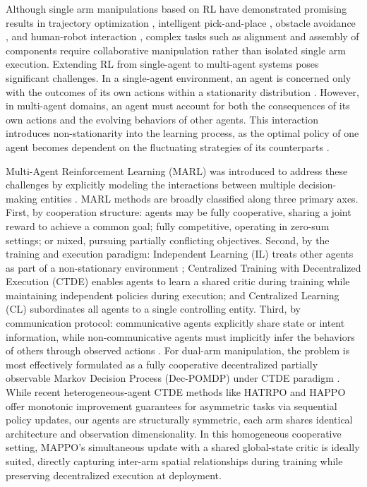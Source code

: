 \documentclass[lettersize,journal]{IEEEtran}
\begin{document}
Although single arm manipulations based on RL have demonstrated promising results in trajectory optimization \cite{intro-11, intro-12, intro-13}, intelligent pick-and-place \cite{intro-14, intro-15}, obstacle avoidance \cite{intro-16, intro-17}, and human-robot interaction \cite{intro-18, intro-19}, complex tasks such as alignment and assembly of components require collaborative manipulation rather than isolated single arm execution. Extending RL from single-agent to multi-agent systems poses significant challenges. In a single-agent environment, an agent is concerned only with the outcomes of its own actions within a stationarity distribution \cite{intro-21}. However, in multi-agent domains, an agent must account for both the consequences of its own actions and the evolving behaviors of other agents. This interaction introduces non-stationarity into the learning process, as the optimal policy of one agent becomes dependent on the fluctuating strategies of its counterparts \cite{intro-20}.

Multi-Agent Reinforcement Learning (MARL) was introduced to address these challenges by explicitly modeling the interactions between multiple decision-making entities \cite{intro-22}. MARL methods are broadly classified along three primary axes. First, by cooperation structure: agents may be fully cooperative, sharing a joint reward to achieve a common goal; fully competitive, operating in zero-sum settings; or mixed, pursuing partially conflicting objectives. Second, by the training and execution paradigm: Independent Learning (IL) treats other agents as part of a non-stationary environment \cite{IPPO}; Centralized Training with Decentralized Execution (CTDE) enables agents to learn a shared critic during training while maintaining independent policies during execution; and Centralized Learning (CL) subordinates all agents to a single controlling entity. Third, by communication protocol: communicative agents explicitly share state or intent information, while non-communicative agents must implicitly infer the behaviors of others through observed actions \cite{intro-23, intro-24, intro-25}. For dual-arm manipulation, the problem is most effectively formulated as a fully cooperative decentralized partially observable Markov Decision Process (Dec-POMDP) under CTDE paradigm \cite{MAPPO}. While recent heterogeneous-agent CTDE methods like HATRPO and HAPPO \cite{happo/htrpo} offer monotonic improvement guarantees for asymmetric tasks via sequential policy updates, our agents are structurally symmetric, each arm shares identical architecture and observation dimensionality. In this homogeneous cooperative setting, MAPPO's simultaneous update with a shared global-state critic is ideally suited, directly capturing inter-arm spatial relationships during training while preserving decentralized execution at deployment.
\end{document}
